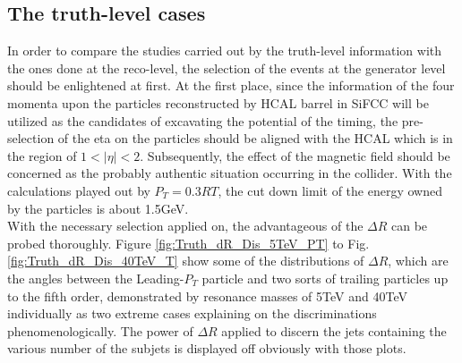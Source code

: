\subsection{The truth-level cases}
In order to compare the studies carried out by the truth-level information with the ones done at the reco-level, the selection of the events at the generator level should be enlightened at first. At the first place, since the information of the four momenta upon the particles reconstructed by HCAL barrel in SiFCC will be utilized as the candidates of excavating the potential of the timing, the pre-selection of the eta on the particles should be aligned with the HCAL which is in the region of  $1<| \eta |<2$. Subsequently, the effect of the magnetic field should be concerned as the probably authentic situation occurring in the collider. With the calculations played out by $P_{T}=0.3RT$, the cut down limit of the energy owned by the particles is about 1.5GeV.\\     

With the necessary selection applied on, the advantageous of the $\Delta R$ can be probed thoroughly. Figure \ref{fig:Truth_dR_Dis_5TeV_PT} to Fig.\ref{fig:Truth_dR_Dis_40TeV_T} show some of the distributions of $\Delta R$, which are the angles between the Leading-$P_{T}$ particle and two sorts of trailing particles up to the fifth order, demonstrated by resonance masses of 5TeV and 40TeV individually as two extreme cases explaining on the discriminations phenomenologically. The power of $\Delta R$ applied to discern the jets containing the various number of the subjets is displayed off obviously with those plots.\\

